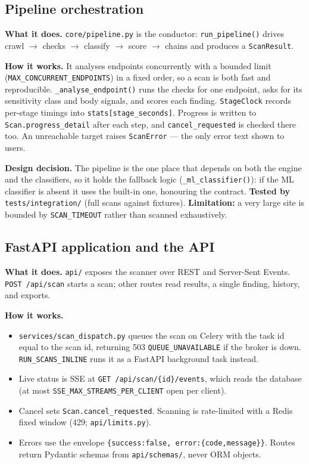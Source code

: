 \subsection{Pipeline orchestration}
\textbf{What it does.} \texttt{core/pipeline.py} is the conductor:
\texttt{run\_pipeline()} drives crawl $\rightarrow$ checks $\rightarrow$ classify
$\rightarrow$ score $\rightarrow$ chains and produces a \texttt{ScanResult}.

\textbf{How it works.} It analyses endpoints concurrently with a bounded limit
(\texttt{MAX\_CONCURRENT\_ENDPOINTS}) in a fixed order, so a scan is both fast and
reproducible. \texttt{\_analyse\_endpoint()} runs the checks for one endpoint,
asks for its sensitivity class and body signals, and scores each finding.
\texttt{StageClock} records per-stage timings into \texttt{stats[stage\_seconds]}.
Progress is written to \texttt{Scan.progress\_detail} after each step, and
\texttt{cancel\_requested} is checked there too. An unreachable target raises
\texttt{ScanError} --- the only error text shown to users.

\textbf{Design decision.} The pipeline is the one place that depends on both the
engine and the classifiers, so it holds the fallback logic
(\texttt{\_ml\_classifier()}): if the ML classifier is absent it uses the
built-in one, honouring the contract. \textbf{Tested by}
\texttt{tests/integration/} (full scans against fixtures).
\textbf{Limitation:} a very large site is bounded by \texttt{SCAN\_TIMEOUT}
rather than scanned exhaustively.

\subsection{FastAPI application and the API}
\textbf{What it does.} \texttt{api/} exposes the scanner over REST and
Server-Sent Events. \texttt{POST /api/scan} starts a scan; other routes read
results, a single finding, history, and exports.

\textbf{How it works.}
\begin{itemize}
\item \texttt{services/scan\_dispatch.py} queues the scan on Celery with the task
id equal to the scan id, returning 503 \texttt{QUEUE\_UNAVAILABLE} if the broker
is down. \texttt{RUN\_SCANS\_INLINE} runs it as a FastAPI background task instead.
\item Live status is SSE at \texttt{GET /api/scan/\{id\}/events}, which reads the
database (at most \texttt{SSE\_MAX\_STREAMS\_PER\_CLIENT} open per client).
\item Cancel sets \texttt{Scan.cancel\_requested}. Scanning is rate-limited with a
Redis fixed window (429; \texttt{api/limits.py}).
\item Errors use the envelope
\texttt{\{success:false, error:\{code,message\}\}}. Routes return Pydantic
schemas from \texttt{api/schemas/}, never ORM objects.
\end{itemize}

